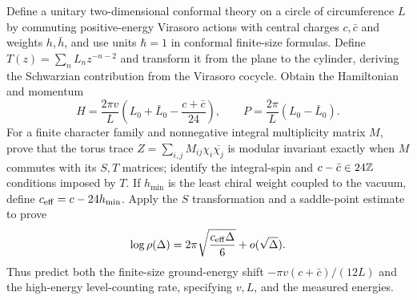 \begin{exercise}
Define a unitary two-dimensional conformal theory on a circle of circumference
$L$ by commuting positive-energy Virasoro actions with central charges
$c,\bar c$ and weights $h,\bar h$, and use units $\hbar=1$ in conformal
finite-size formulas.  Define $T(z)=\sum_nL_nz^{-n-2}$ and transform it from
the plane to the cylinder, deriving the Schwarzian contribution from the
Virasoro cocycle.  Obtain the Hamiltonian and momentum
\[
 H=\frac{2\pi v}{L}\left(L_0+\bar L_0-\frac{c+\bar c}{24}\right),
 \qquad P=\frac{2\pi}{L}(L_0-\bar L_0).
\]
For a finite character family and nonnegative integral multiplicity matrix
$M$, prove that the torus trace
$Z=\sum_{i,j}M_{ij}\chi_i\overline{\chi_j}$ is modular invariant exactly
when $M$ commutes with its $S,T$ matrices; identify the integral-spin and
$c-\bar c\in24\mathbb Z$ conditions imposed by $T$.  If $h_{\min}$ is the least
chiral weight coupled to the vacuum, define
$c_{\rm eff}=c-24h_{\min}$.  Apply the $S$ transformation and a saddle-point
estimate to prove
\[
 \log\rho(\Delta)=2\pi\sqrt{\frac{c_{\rm eff}\Delta}{6}}+o(\sqrt\Delta).
\]
Thus predict both the finite-size ground-energy shift
$-\pi v(c+\bar c)/(12L)$ and the high-energy level-counting rate, specifying
$v,L$, and the measured energies.
\end{exercise}
